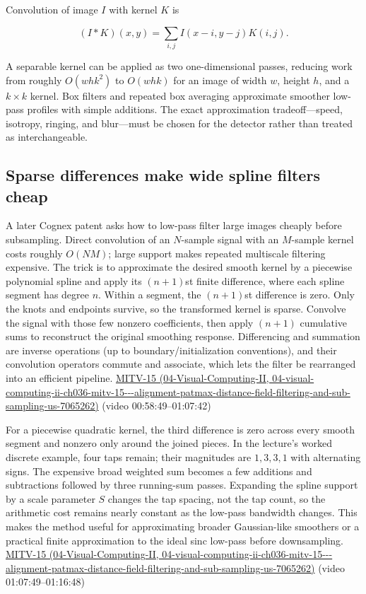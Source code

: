 Convolution of image \(I\) with kernel \(K\) is

\[
(I*K)(x,y)=\sum_{i,j}I(x-i,y-j)K(i,j).
\]

A separable kernel can be applied as two one-dimensional passes, reducing work from roughly \(O(whk^2)\) to \(O(whk)\) for an image of width \(w\), height \(h\), and a \(k\times k\) kernel. Box filters and repeated box averaging approximate smoother low-pass profiles with simple additions. The exact approximation tradeoff---speed, isotropy, ringing, and blur---must be chosen for the detector rather than treated as interchangeable.

\subsection{Sparse differences make wide spline filters cheap}\label{03-visual-computing-i-ch004-sparse-differences-make-wide-spline-filters-cheap}

A later Cognex patent asks how to low-pass filter large images cheaply before subsampling. Direct convolution of an \(N\)-sample signal with an \(M\)-sample kernel costs roughly \(O(NM)\); large support makes repeated multiscale filtering expensive. The trick is to approximate the desired smooth kernel by a piecewise polynomial spline and apply its \((n+1)\)st finite difference, where each spline segment has degree \(n\). Within a segment, the \((n+1)\)st difference is zero. Only the knots and endpoints survive, so the transformed kernel is sparse. Convolve the signal with those few nonzero coefficients, then apply \((n+1)\) cumulative sums to reconstruct the original smoothing response. Differencing and summation are inverse operations (up to boundary/initialization conventions), and their convolution operators commute and associate, which lets the filter be rearranged into an efficient pipeline. \href{../04-Visual-Computing-II/main.pdf\#nameddest=04-visual-computing-ii-ch036-mitv-15---alignment-patmax-distance-field-filtering-and-sub-sampling-us-7065262}{MITV-15 (04-Visual-Computing-II, 04-visual-computing-ii-ch036-mitv-15-\/-\/-alignment-patmax-distance-field-filtering-and-sub-sampling-us-7065262)} (video 00:58:49--01:07:42)

For a piecewise quadratic kernel, the third difference is zero across every smooth segment and nonzero only around the joined pieces. In the lecture's worked discrete example, four taps remain; their magnitudes are \(1,3,3,1\) with alternating signs. The expensive broad weighted sum becomes a few additions and subtractions followed by three running-sum passes. Expanding the spline support by a scale parameter \(S\) changes the tap spacing, not the tap count, so the arithmetic cost remains nearly constant as the low-pass bandwidth changes. This makes the method useful for approximating broader Gaussian-like smoothers or a practical finite approximation to the ideal sinc low-pass before downsampling. \href{../04-Visual-Computing-II/main.pdf\#nameddest=04-visual-computing-ii-ch036-mitv-15---alignment-patmax-distance-field-filtering-and-sub-sampling-us-7065262}{MITV-15 (04-Visual-Computing-II, 04-visual-computing-ii-ch036-mitv-15-\/-\/-alignment-patmax-distance-field-filtering-and-sub-sampling-us-7065262)} (video 01:07:49--01:16:48)


